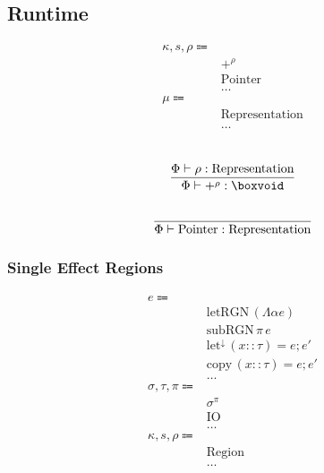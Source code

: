 \documentclass {article}
\begin{document}
\subsection{Runtime}

\begin{align*}
\kappa, s, \rho \Coloneqq & \\
& +^\rho \tag{Pretype Kind}\\
& \text{Pointer} \tag{Pointer Representation}\\
& \dots \\
\mu \Coloneqq & \\
& \text{Representation} \\
& \dots
\end{align*}

\begin{gather*}
\\
\frac
{\Phi \vdash \rho : \text{Representation}}
{\Phi \vdash +^\rho : \boxvoid} \\
\\
\frac
{}
{\Phi \vdash \text{Pointer} : \text{Representation}} \\
\end{gather*}

\subsubsection{Single Effect Regions}
\begin{align*}
e \Coloneqq & \\
& \text{letRGN} \, (\Lambda \alpha e) \tag{Create Region} \\
& \text{subRGN} \, \pi \, e \tag{Subtype Region} \\
& \text{let}^\downarrow \, (x :: \tau) = e; e' \tag{Runtime Let} \\
& \text{copy} \, (x :: \tau) = e; e' \tag{Runtime Copy Let} \\
& \dots \\
\sigma, \tau, \pi \Coloneqq & \\
& \sigma^\pi \tag{Region Effect} \\
& \text{IO} \tag{IO Region} \\
& \dots \\
\kappa, s, \rho \Coloneqq & \\
& \text{Region} \tag{Region} \\
& \dots
\end{align*}
\end{document}
